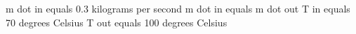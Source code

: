 m dot in equals 0.3 kilograms per second  
m dot in equals m dot out  
T in equals 70 degrees Celsius  
T out equals 100 degrees Celsius